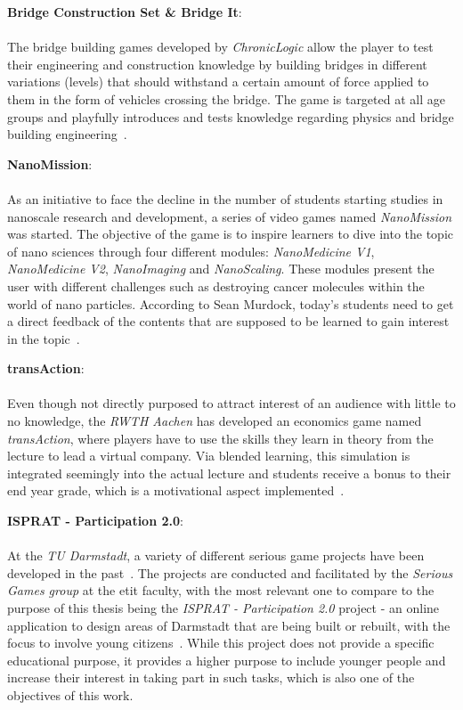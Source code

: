 \textbf{Bridge Construction Set \& Bridge It}:\\ \\
The bridge building games developed by \textit{ChronicLogic} allow the player to test their engineering and
construction knowledge by building bridges in different variations (levels) that should withstand a certain amount
of force applied to them in the form of vehicles crossing the bridge.
The game is targeted at all age groups and playfully introduces and tests knowledge regarding physics and bridge
building engineering~\cite{Bridebuilder}.

\textbf{NanoMission}:\\ \\
As an initiative to face the decline in the number of students starting studies in nanoscale research and development,
a series of video games named \textit{NanoMission} was started.
The objective of the game is to inspire learners to dive into the topic of nano sciences through four different modules:
\textit{NanoMedicine V1}, \textit{NanoMedicine V2}, \textit{NanoImaging} and \textit{NanoScaling}.
These modules present the user with different challenges such as destroying cancer molecules within the world of
nano particles.
According to Sean Murdock, today's students need to get a direct feedback of the contents that are supposed
to be learned to gain interest in the topic~\cite{nanomission}.

\textbf{transAction}:\\ \\
Even though not directly purposed to attract interest of an audience with little to no knowledge, the \textit{RWTH Aachen}
has developed an economics game named \textit{transAction}, where players have to use the skills they learn in theory from
the lecture to lead a virtual company.
Via blended learning, this simulation is integrated seemingly into the actual lecture and students receive a bonus to
their end year grade, which is a motivational aspect implemented~\cite{rwth-aachen:transaction}.

\textbf{ISPRAT - Participation 2.0}:\\ \\
At the \textit{TU Darmstadt}, a variety of different serious game projects have been developed in the past~\cite{tu-darm:projectslist}.
The projects are conducted and facilitated by the \textit{Serious Games group} at the etit faculty, with the most relevant
one to compare to the purpose of this thesis being the \textit{ISPRAT - Participation 2.0} project - an online application to design
areas of Darmstadt that are being built or rebuilt, with the focus to involve young citizens~\cite{tu-darm:projectslist, tu-darm:ISPRAT}.
While this project does not provide a specific educational purpose, it provides a higher purpose to include younger people
and increase their interest in taking part in such tasks, which is also one of the objectives of this work.
